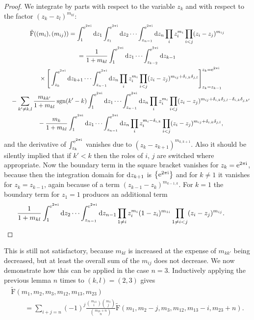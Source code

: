 \documentclass[10pt,a4paper]{amsart}
\numberwithin{equation}{section}
\renewcommand{\i}{\mathrm{i}}
\renewcommand{\d}{\mathrm{d}}
\newcommand{\rFp}{\tilde{\mathrm{F}}}
\begin{document}
\begin{proof}We integrate by parts with respect to the variable $z_k$ and with
respect to the factor $(z_k-z_l)^{m_{kl}}$:
\begin{gather*}
\rFp((m_i),(m_{ij}))
=\int_1^{{\rm e}^{2\pi\i }}\d z_1 \int_{z_1}^{{\rm e}^{2\pi\i }}\d z_2\cdots\int_{z_{n-1}}^{{\rm e}^{2\pi\i }}\d z_n\prod_i
z_i^{m_i}\prod_{i<j}(z_i - z_j)^{m_{ij}}\\
=\frac{1}{1+m_{kl}}\int_1^{{\rm e}^{2\pi\i }}\d z_1\cdots 
\int_{z_{k-2}}^{{\rm e}^{2\pi\i }}\d z_{k-1}\\
\quad {} \times\Bigg[\int_{z_k}^{{\rm e}^{2\pi\i }}\d z_{k+1}\cdots\int_{z_{n-1}}^{{\rm e}^{2\pi\i }}\d z_n \prod_i
z_i^{m_i}\prod_{i<j}(z_i - z_j)^{m_{ij}+\delta_{i,k}\delta_{j,l}}\Bigg]_{z_k=z_{k-1}}^{z_k={\rm e}^{2\pi\i }}\\
\quad{} -\sum_{k'\neq k,l} \frac{m_{kk'}}{1+m_{kl}}\operatorname{sgn}(k'-k)
\int_1^{{\rm e}^{2\pi\i }}\d z_1 \cdots \int_{z_{n-1}}^{{\rm e}^{2\pi\i }}\d z_n \prod_i
z_i^{m_i}\prod_{i<j}(z_i -z_j)^{m_{ij}+\delta_{i,k}\delta_{j,l}-\delta_{i,k}\delta_{j,k'}} \\
\quad{}-\frac{m_{k}}{1+m_{kl}}\int_1^{{\rm e}^{2\pi\i }}\d z_1\cdots
\int_{z_{n-1}}^{{\rm e}^{2\pi\i }}\d z_n \prod_i z_i^{m_i-\delta_{i,k}}\prod_{i<j}(z_i -z_j)^{m_{ij}+\delta_{i,k}\delta_{j,l}},
\end{gather*}
and the derivative of $\int_{z_k}^{{\rm e}^{2\pi\i}}$ vanishes due to $(z_k-z_{k+1})^{m_{k,k+1}}$. Also it should be silently implied that if $k'<k$ then the roles of $i$, $j$ are switched where appropriate. Now the boundary term in the square bracket vanishes for $z_k={\rm e}^{2\pi\i}$, because then the integration domain for ${\rm d}z_{k+1}$ is $\big\{{\rm e}^{2\pi\i }\big\}$ and for $k\neq 1$ it vanishes for $z_k=z_{k-1}$, again because of a term $(z_{k-1}-z_k)^{m_{k-1,k}}$. For $k=1$ the boundary term for $z_1=1$ produces an additional term
\[
\frac{1}{1+m_{kl}}\int_1^{{\rm e}^{2\pi\i }}\d z_2\cdots \int_{z_{n-1}}^{{\rm e}^{2\pi\i }}\d z_{n-1} \prod_{1\neq i}
z_i^{m_i}(1-z_i)^{m_{1i}}\prod_{1\neq i<j}(z_i - z_j)^{m_{ij}}.\tag*{\qed}
\]\renewcommand{\qed}{}
\end{proof}

This is still not satisfactory, because $m_{kl}$ is increased at the
expense of $m_{kk'}$ being decreased, but at least the overall sum of
the $m_{ij}$ does not decrease. We now demonstrate how this can be
applied in the case $n=3$. Inductively applying the previous lemma $n$
times to $(k,l)=(2,3)$ gives
\begin{gather*}
\rFp(m_1,m_2,m_3,m_{12},m_{13},m_{23})\\
\qquad =\sum_{i+j=n}(-1)^j\frac{{m_{13} \choose i}{m_{3} \choose j}}{{m_{23}+n
\choose n}}\rFp(m_1,m_2-j,m_3,m_{12},m_{13}-i,m_{23}+n).
\end{gather*}
\end{document}
